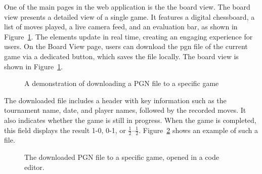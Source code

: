 One of the main pages in the web application is the the board view. The board view presents a detailed view of a single game. It features a digital chessboard, a list of moves played, a live camera feed, and an evaluation bar, as shown in Figure~\ref{fig:download-pgn}. The elements update in real time, creating an engaging experience for users. On the Board View page, users can download the \gls{pgn} file of the current game via a dedicated button, which saves the file locally. The board view is shown in Figure~\ref{fig:download-pgn}. \\

\begin{figure}[h!] \centering {}\caption[Display of board view]{A demonstration of downloading a PGN file to a specific game}\label{fig:download-pgn} \end{figure}

The downloaded file includes a header with key information such as the tournament name, date, and player names, followed by the recorded moves. It also indicates whether the game is still in progress. When the game is completed, this field displays the result 1-0, 0-1, or $\frac{1}{2}$–$\frac{1}{2}$. Figure~\ref{fig:downloaded-pgn} shows an example of such a file. \\

\begin{figure}[h!] \centering {}\caption[PGN file and metadata]{The downloaded PGN file to a specific game, opened in a code editor.}\label{fig:downloaded-pgn} \end{figure}

